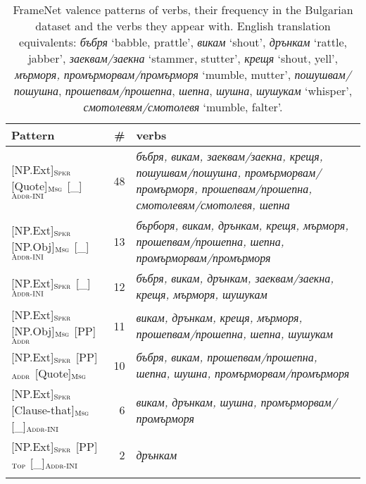 \documentclass[output=paper,colorlinks,citecolor=brown]{langscibook}
\begin{document}
\begin{table}
\begin{tabularx}{\textwidth}{lrQ}
\lsptoprule
         Pattern  & \#  & verbs \\\midrule
{[NP.Ext]}$_{\text{\textsc{Spkr}}}$ {[Quote]}$_{\text{\textsc{Msg}}}$ {[\_]}$_{\text{\textsc{Addr-INI}}}$ & 48 & \textit{бъбря, викам, заеквам\slash заекна, крещя, пошушвам\slash пошушна, промърморвам\slash промърморя, прошепвам\slash прошепна, смотолевям\slash смотолевя, шепна}\\
{[NP.Ext]}$_{\text{\textsc{Spkr}}}$ {[NP.Obj]}$_{\text{\textsc{Msg}}}$ {[\_]}$_{\text{\textsc{Addr-INI}}}$ & 13 & \textit{бърборя, викам, дрънкам, крещя, мърморя, прошепвам\slash прошепна, шепна, промърморвам\slash промърморя}\\
{[NP.Ext]}$_{\text{\textsc{Spkr}}}$ {[\_]}$_{\text{\textsc{Addr-INI}}}$ & 12 & \textit{бъбря, викам, дрънкам, заеквам\slash заекна, крещя, мърморя, шушукам}\\
{[NP.Ext]}$_{\text{\textsc{Spkr}}}$ {[NP.Obj]}$_{\text{\textsc{Msg}}}$ {[PP]}$_{\text{\textsc{Addr}}}$ & 11 & \textit{викам, дрънкам, крещя, мърморя, прошепвам\slash прошепна, шепна, шушукам}\\
{[NP.Ext]}$_{\text{\textsc{Spkr}}}$ {[PP]}$_{\text{\textsc{Addr}}}$ {[Quote]}$_{\text{\textsc{Msg}}}$ & 10 & \textit{бъбря, викам, прошепвам\slash прошепна, шепна, шушна, промърморвам\slash промърморя}\\
{[NP.Ext]}$_{\text{\textsc{Spkr}}}$ {[Clause-that]}$_{\text{\textsc{Msg}}}$ {[\_]}$_{\text{\textsc{Addr-INI}}}$ & 6 & \textit{викам, дрънкам, шушна, промърморвам\slash промърморя}\\
{[NP.Ext]}$_{\text{\textsc{Spkr}}}$ {[PP]}$_{\text{\textsc{Top}}}$ {[\_]}$_{\text{\textsc{Addr-INI}}}$ & 2 & \textit{дрънкам}\\
\lspbottomrule
\end{tabularx}
    \caption{FrameNet valence patterns of  verbs, their frequency in the Bulgarian dataset and the verbs they appear with.    
    English translation equivalents: \textit{бъбря} `babble, prattle', \textit{викам} `shout', \textit{дрънкам} `rattle, jabber', \textit{заеквам\slash заекна} `stammer, stutter', \textit{крещя} `shout, yell', \textit{мърморя, промърморвам\slash промърморя} `mumble, mutter', \textit{пошушвам\slash пошушна}, \textit{прошепвам\slash прошепна}, \textit{шепна}, \textit{шушна}, \textit{шушукам} `whisper', \textit{смотолевям\slash смотолевя} `mumble, falter'.} 
    \label{tbl:communication-manner-valence-bg}
\end{table} 
\end{document}
